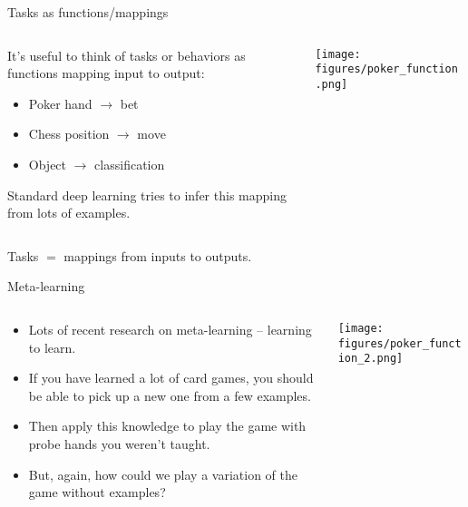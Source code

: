 \documentclass{beamer}
\begin{document}
\begin{frame}{Tasks as functions/mappings}
\begin{columns}
\begin{column}{0.5\textwidth}
It's useful to think of tasks or behaviors as functions mapping input to output:
\begin{itemize}
    \item Poker hand \(\rightarrow\) bet
    \item Chess position \(\rightarrow\) move
    \item Object \(\rightarrow\) classification
\end{itemize}
Standard deep learning tries to infer this mapping from lots of examples. 
\end{column}

\begin{column}{0.5\textwidth}
\texttt{[image: figures/poker\_function.png]}
\end{column}
\end{columns}
\end{frame}

\begin{frame}[standout]
Tasks \(\bm =\) mappings from inputs to outputs. 
\end{frame}

\begin{frame}{Meta-learning}
\begin{columns}
\begin{column}{0.5\textwidth}

\begin{itemize}[<+->]
    \item Lots of recent research on meta-learning -- learning to learn.
    \item If you have learned a lot of card games, you should be able to pick up a new one from a few examples.
    \item Then apply this knowledge to play the game with probe hands you weren't taught. 
    \item But, again, how could we play a variation of the game without examples? 
\end{itemize}
\end{column}

\begin{column}{0.5\textwidth}
\texttt{[image: figures/poker\_function\_2.png]}
\end{column}
\end{columns}
\end{frame}
\end{document}
